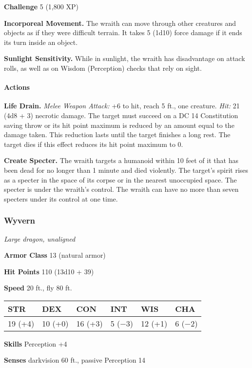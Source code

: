 \documentclass[
]{article}
\begin{document}
\textbf{Challenge} 5 (1,800 XP)

\textbf{Incorporeal Movement.} The wraith can move through other
creatures and objects as if they were difficult terrain. It takes 5
(1d10) force damage if it ends its turn inside an object.

\textbf{Sunlight Sensitivity.} While in sunlight, the wraith has
disadvantage on attack rolls, as well as on Wisdom (Perception) checks
that rely on sight.

\hypertarget{actions-2}{%
\paragraph{Actions}\label{actions-2}}

\textbf{Life Drain.} \emph{Melee Weapon Attack:} +6 to hit, reach 5 ft.,
one creature. \emph{Hit:} 21 (4d8 + 3) necrotic damage. The target must
succeed on a DC 14 Constitution saving throw or its hit point maximum is
reduced by an amount equal to the damage taken. This reduction lasts
until the target finishes a long rest. The target dies if this effect
reduces its hit point maximum to 0.

\textbf{Create Specter.} The wraith targets a humanoid within 10 feet of
it that has been dead for no longer than 1 minute and died violently.
The target's spirit rises as a specter in the space of its corpse or in
the nearest unoccupied space. The specter is under the wraith's control.
The wraith can have no more than seven specters under its control at one
time.

\hypertarget{wyvern}{%
\subsubsection{Wyvern}\label{wyvern}}

\emph{Large dragon, unaligned}

\textbf{Armor Class} 13 (natural armor)

\textbf{Hit Points} 110 (13d10 + 39)

\textbf{Speed} 20 ft., fly 80 ft.

\begin{longtable}[]{@{}llllll@{}}
\toprule
STR & DEX & CON & INT & WIS & CHA\tabularnewline
\midrule
\endhead
19 (+4) & 10 (+0) & 16 (+3) & 5 (−3) & 12 (+1) & 6 (−2)\tabularnewline
\bottomrule
\end{longtable}

\textbf{Skills} Perception +4

\textbf{Senses} darkvision 60 ft., passive Perception 14
\end{document}
